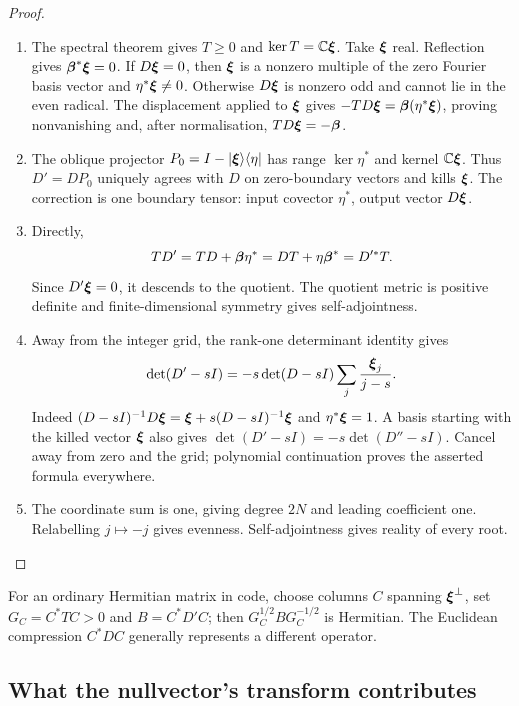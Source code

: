 \begin{proof}
\begin{enumerate}
\item[$\langle1\rangle$1.] The spectral theorem gives $T\geq0$ and
$\ker T=\mathbb C\boldsymbol{\xi}$. Take $\boldsymbol{\xi}$ real. Reflection gives
$\boldsymbol{\beta}^*\boldsymbol{\xi}=0$. If $D\boldsymbol{\xi}=0$, then $\boldsymbol{\xi}$ is a nonzero multiple
of the zero Fourier basis vector and $\eta^*\boldsymbol{\xi}\ne0$.
Otherwise $D\boldsymbol{\xi}$ is nonzero odd and cannot lie in the even radical.
The displacement applied to $\boldsymbol{\xi}$ gives
$-TD\boldsymbol{\xi}=\boldsymbol{\beta}(\eta^*\boldsymbol{\xi})$, proving nonvanishing and, after
normalisation, $TD\boldsymbol{\xi}=-\boldsymbol{\beta}$.
\item[$\langle1\rangle$2.] The oblique projector
$P_0=I-|\boldsymbol{\xi}\rangle\langle\eta|$ has range $\ker\eta^*$ and
kernel $\mathbb C\boldsymbol{\xi}$. Thus $D'=DP_0$ uniquely agrees with $D$
on zero-boundary vectors and kills $\boldsymbol{\xi}$. The correction is one
boundary tensor: input covector $\eta^*$, output vector $D\boldsymbol{\xi}$.
\item[$\langle1\rangle$3.] Directly,
\[
 TD'=TD+\boldsymbol{\beta}\eta^*=DT+\eta\boldsymbol{\beta}^*=D'^*T.
\]
Since $D'\boldsymbol{\xi}=0$, it descends to the quotient. The quotient metric
is positive definite and finite-dimensional symmetry gives
self-adjointness.
\item[$\langle1\rangle$4.] Away from the integer grid, the rank-one
determinant identity gives
\[
 \det(D'-sI)=-s\det(D-sI)\sum_j\frac{\boldsymbol{\xi}_j}{j-s}.
\]
Indeed $(D-sI)^{-1}D\boldsymbol{\xi}=\boldsymbol{\xi}+s(D-sI)^{-1}\boldsymbol{\xi}$ and
$\eta^*\boldsymbol{\xi}=1$. A basis starting with the killed vector $\boldsymbol{\xi}$
also gives $\det(D'-sI)=-s\det(D''-sI)$.
Cancel away from zero and the grid; polynomial continuation proves
the asserted formula everywhere.
\item[$\langle1\rangle$5.] The coordinate sum is one, giving degree
$2N$ and leading coefficient one. Relabelling $j\mapsto-j$ gives
evenness. Self-adjointness gives reality of every root.
\end{enumerate}
\end{proof}

For an ordinary Hermitian matrix in code, choose columns $C$ spanning
$\boldsymbol{\xi}^\perp$, set $G_C=C^*TC>0$ and $B=C^*D'C$; then
$G_C^{1/2}BG_C^{-1/2}$ is Hermitian. The Euclidean compression
$C^*DC$ generally represents a different operator.

\subsection{What the nullvector's transform contributes}

